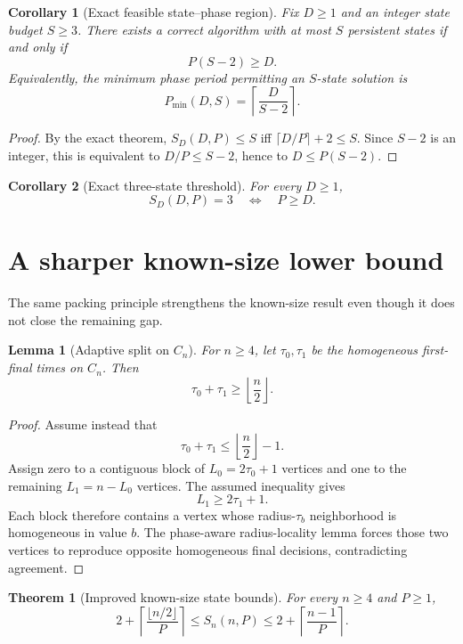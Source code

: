 \documentclass[11pt]{article}
\newtheorem{theorem}{Theorem}
\newtheorem{lemma}{Lemma}
\newtheorem{corollary}{Corollary}
\theoremstyle{remark}
\begin{document}
\begin{corollary}[Exact feasible state--phase region]
Fix $D\ge1$ and an integer state budget $S\ge3$.  There exists a correct algorithm with at most $S$ persistent states if and only if
\[
\boxed{P(S-2)\ge D.}
\]
Equivalently, the minimum phase period permitting an $S$-state solution is
\[
\boxed{P_{\min}(D,S)=\left\lceil\frac{D}{S-2}\right\rceil.}
\]
\end{corollary}

\begin{proof}
By the exact theorem, $S_D(D,P)\le S$ iff $\lceil D/P\rceil+2\le S$.  Since $S-2$ is an integer, this is equivalent to $D/P\le S-2$, hence to $D\le P(S-2)$.
\end{proof}

\begin{corollary}[Exact three-state threshold]
For every $D\ge1$,
\[
S_D(D,P)=3
\quad\Longleftrightarrow\quad
P\ge D.
\]
\end{corollary}

\section{A sharper known-size lower bound}

The same packing principle strengthens the known-size result even though it does not close the remaining gap.

\begin{lemma}[Adaptive split on $C_n$]
For $n\ge4$, let $\tau_0,\tau_1$ be the homogeneous first-final times on $C_n$.  Then
\[
\tau_0+\tau_1\ge \left\lfloor\frac{n}{2}\right\rfloor.
\]
\end{lemma}

\begin{proof}
Assume instead that
\[
\tau_0+\tau_1\le \left\lfloor\frac{n}{2}\right\rfloor-1.
\]
Assign zero to a contiguous block of $L_0=2\tau_0+1$ vertices and one to the remaining $L_1=n-L_0$ vertices.  The assumed inequality gives
\[
L_1\ge2\tau_1+1.
\]
Each block therefore contains a vertex whose radius-$\tau_b$ neighborhood is homogeneous in value $b$.  The phase-aware radius-locality lemma forces those two vertices to reproduce opposite homogeneous final decisions, contradicting agreement.
\end{proof}

\begin{theorem}[Improved known-size state bounds]
For every $n\ge4$ and $P\ge1$,
\[
\boxed{
2+\left\lceil\frac{\lfloor n/2\rfloor}{P}\right\rceil
\le S_n(n,P)
\le
2+\left\lceil\frac{n-1}{P}\right\rceil.
}
\]
\end{theorem}
\end{document}
